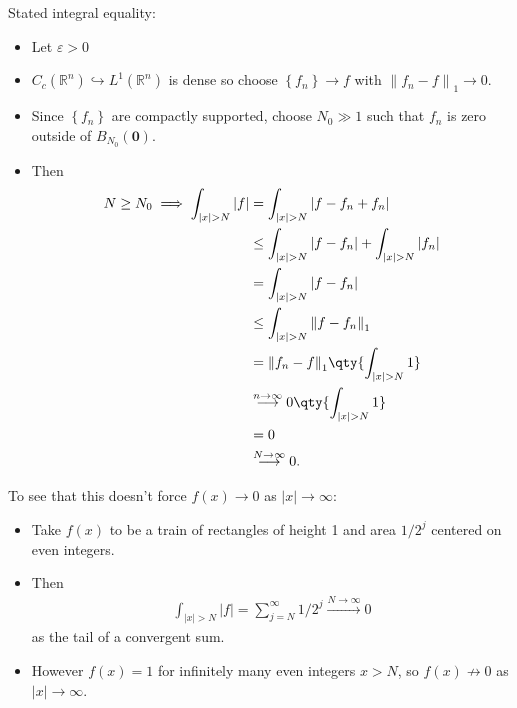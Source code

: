 \begin{solution}[of a]

Stated integral equality:

\begin{itemize}
\tightlist
\item
  Let \({\varepsilon}> 0\)
\item
  \(C_c({\mathbb{R}}^n) \hookrightarrow L^1({\mathbb{R}}^n)\) is dense
  so choose \(\left\{{f_n}\right\} \to f\) with
  \({\left\lVert {f_n - f} \right\rVert}_1 \to 0\).
\item
  Since \(\left\{{f_n}\right\}\) are compactly supported, choose
  \(N_0\gg 1\) such that \(f_n\) is zero outside of
  \(B_{N_0}(\mathbf{0})\).
\item
  Then
  \begin{align*}
  N\geq N_0 \implies \int_{{\left\lvert {x} \right\rvert} > N} {\left\lvert {f} \right\rvert} &= \int_{{\left\lvert {x} \right\rvert} > N} {\left\lvert {f - f_n + f_n} \right\rvert} \\
  &\leq \int_{{\left\lvert {x} \right\rvert} > N} {\left\lvert {f-f_n} \right\rvert} + \int_{{\left\lvert {x} \right\rvert} > N} {\left\lvert {f_n} \right\rvert} \\
  &= \int_{{\left\lvert {x} \right\rvert} > N} {\left\lvert {f-f_n} \right\rvert} \\ 
  &\leq \int_{{\left\lvert {x} \right\rvert} > N} {\left\lVert {f-f_n} \right\rVert}_1 \\
  &= {\left\lVert {f_n-f} \right\rVert}_1 \qty{\int_{{\left\lvert {x} \right\rvert} > N} 1} \\
  &\overset{n\to\infty}\longrightarrow 0 \qty{\int_{{\left\lvert {x} \right\rvert} > N} 1} \\
  &= 0\\
  &\overset{N\to\infty}\longrightarrow 0
  .\end{align*}
\end{itemize}

To see that this doesn't force \(f(x)\to 0\) as
\({\left\lvert {x} \right\rvert} \to \infty\):

\begin{itemize}
\tightlist
\item
  Take \(f(x)\) to be a train of rectangles of height 1 and area
  \(1/2^j\) centered on even integers.
\item
  Then
  \begin{align*}\int_{{\left\lvert {x} \right\rvert} > N} {\left\lvert {f} \right\rvert} = \sum_{j=N}^\infty 1/2^j \overset{N\to\infty}\longrightarrow 0\end{align*}
  as the tail of a convergent sum.
\item
  However \(f(x) = 1\) for infinitely many even integers \(x > N\), so
  \(f(x) \not\to 0\) as \({\left\lvert {x} \right\rvert}\to\infty\).
\end{itemize}

\end{solution}

